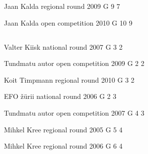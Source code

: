 \documentclass[11pt]{article}
\begin{document}
\ylDisplay{} %
{Jaan Kalda} %
{regional round} %
{2009} %
{G 9} %
{7} %
{

\ifEngStatement
\fi
}

\ylDisplay{} %
{Jaan Kalda} %
{open competition} %
{2010} %
{G 10} %
{9} %
{

\ifEngStatement
\fi
}
\newpage\subsection{\protect{}}

\ylDisplay{} %
{Valter Kiisk} %
{national round} %
{2007} %
{G 3} %
{2} %
{

\ifEngStatement
\fi
}

\ylDisplay{} %
{Tundmatu autor} %
{open competition} %
{2009} %
{G 2} %
{2} %
{

\ifEngStatement
\fi
}

\ylDisplay{} %
{Koit Timpmann} %
{regional round} %
{2010} %
{G 3} %
{2} %
{

\ifEngStatement
\fi
}

\ylDisplay{} %
{EFO žürii} %
{national round} %
{2006} %
{G 2} %
{3} %
{

\ifEngStatement
\fi
}

\ylDisplay{} %
{Tundmatu autor} %
{open competition} %
{2007} %
{G 4} %
{3} %
{

\ifEngStatement
\fi
}

\ylDisplay{} %
{Mihkel Kree} %
{regional round} %
{2005} %
{G 5} %
{4} %
{

\ifEngStatement
\fi
}

\ylDisplay{} %
{Mihkel Kree} %
{regional round} %
{2006} %
{G 6} %
{4} %
{

\ifEngStatement
\fi
}
\end{document}
